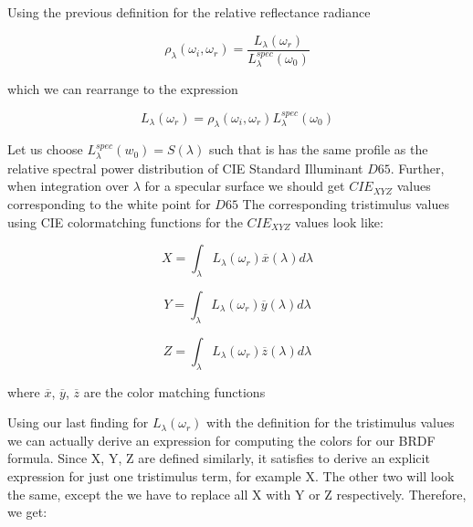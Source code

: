 Using the previous definition for the relative reflectance radiance 

\begin{equation}
 \rho_\lambda(\omega_i,\omega_r) = \frac{L_\lambda(\omega_r)}{L_\lambda^{spec}(\omega_0)} 
\end{equation}

which we can rearrange to the expression 

\begin{equation}
L_\lambda(\omega_r) = \rho_\lambda(\omega_i,\omega_r)L_\lambda^{spec}(\omega_0)
\end{equation}

Let us choose $L_\lambda^{spec}(w_0) = S(\lambda)$ such that is has the same profile as the relative spectral power distribution of CIE Standard Illuminant $D65$. Further, when integration over $\lambda$ for a specular surface we should get $CIE_{XYZ}$ values corresponding to the white point for $D65$ 
The corresponding tristimulus values using CIE colormatching functions for the $CIE_{XYZ}$ values look like:

\begin{equation}
X = \int_{\lambda}L_\lambda(\omega_r)\overline{x}(\lambda)d\lambda
\end{equation} 

\begin{equation}
Y = \int_{\lambda}L_\lambda(\omega_r)\overline{y}(\lambda)d\lambda
\end{equation}

\begin{equation}
Z = \int_{\lambda}L_\lambda(\omega_r)\overline{z}(\lambda)d\lambda
\end{equation}

where $\overline{x}$, $\overline{y}$, $\overline{z}$ are the color matching functions

Using our last finding for $L_\lambda(\omega_r)$ with the definition for the tristimulus values we can actually derive an expression for computing the colors for our BRDF formula. 
Since X, Y, Z are defined similarly, it satisfies to derive an explicit expression for just one tristimulus term, for example X. The other two will look the same, except the we have to replace all X with Y or Z respectively. Therefore, we get:

